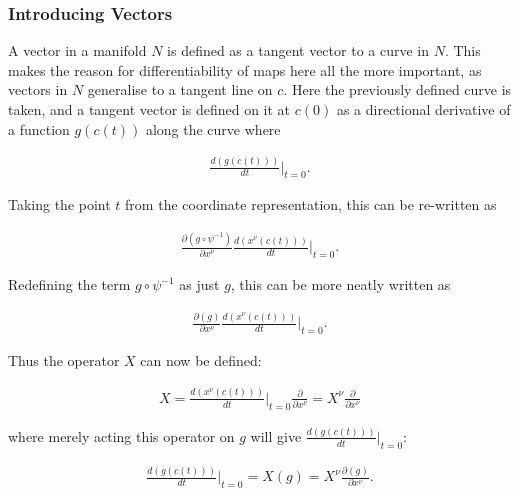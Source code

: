 \documentclass[fleqn, twocolumn, 10pt]{article}
\begin{document}

\subsubsection{Introducing Vectors}

A vector in a manifold $N$ is defined as a tangent vector to a curve in $N$. This makes the reason for differentiability of maps here all the more important, as vectors in $N$ generalise to a tangent line on $c$. Here the previously defined curve is taken, and a tangent vector is defined on it at $c(0)$ as a directional derivative of a function $g(c(t))$ along the curve where

\begin{ceqn}
\begin{align*}
\frac{d(g(c(t)))}{dt} \biggr\rvert_{t = 0}.
\end{align*}
\end{ceqn}
Taking the point $t$ from the coordinate representation, this can be re-written as

\begin{ceqn}
\begin{align*}
\frac{\partial (g \circ \psi^{-1})}{\partial x^\nu}\frac{d(x^\nu(c(t)))}{dt}\biggr\rvert_{t = 0}.
\end{align*}
\end{ceqn}
Redefining the term $g \circ \psi^{-1}$ as just $g$, this can be more neatly written as 

\begin{ceqn}
\begin{align*}
\frac{\partial (g)}{\partial x^\nu}\frac{d(x^\nu(c(t)))}{dt}\biggr\rvert_{t = 0}.
\end{align*}
\end{ceqn}
Thus the operator $X$ can now be defined:

\begin{ceqn}
\begin{align*}
X = \frac{d(x^\nu(c(t)))}{dt}\biggr\rvert_{t = 0} \frac{\partial}{\partial x^\nu} = X^\nu \frac{\partial}{\partial x^\nu}
\end{align*}
\end{ceqn}
where merely acting this operator on $g$ will give $\frac{d(g(c(t)))}{dt}\biggr\rvert_{t = 0}$:

\begin{ceqn}
\begin{align*}
\frac{d(g(c(t)))}{dt}\biggr\rvert_{t = 0} = X(g) = X^\nu \frac{\partial (g)}{\partial x^\nu}.
\end{align*}
\end{ceqn}\\
\end{document}
